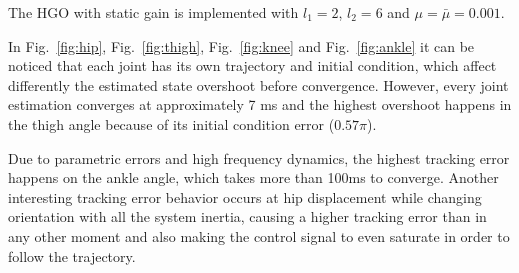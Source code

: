 \documentclass[letterpaper, 10 pt, conference]{ieeeconf}  %
\theoremstyle{plain}
\theoremstyle{definition}
\theoremstyle{remark}
\begin{document}
The HGO with static gain is implemented with $l_1=2$, $l_2=6$ and $\mu=\bar{\mu}=0.001$.
%
%

In Fig.~\ref{fig:hip}, Fig.~\ref{fig:thigh}, Fig.~\ref{fig:knee} and Fig.~\ref{fig:ankle} it can be noticed that each joint has its own trajectory and initial condition, which affect differently the estimated state overshoot before convergence. However, every joint estimation converges at approximately 7 ms and the highest overshoot happens in the thigh angle because of its initial condition error ($0.57\pi$).

Due to parametric errors and high frequency dynamics, the highest tracking error happens on the ankle angle, which takes more than 100ms to converge. Another interesting tracking error behavior occurs at hip displacement while changing orientation with all the system inertia, causing a higher tracking error than in any other moment and also making the control signal to even saturate in order to follow the trajectory.  
\end{document}
